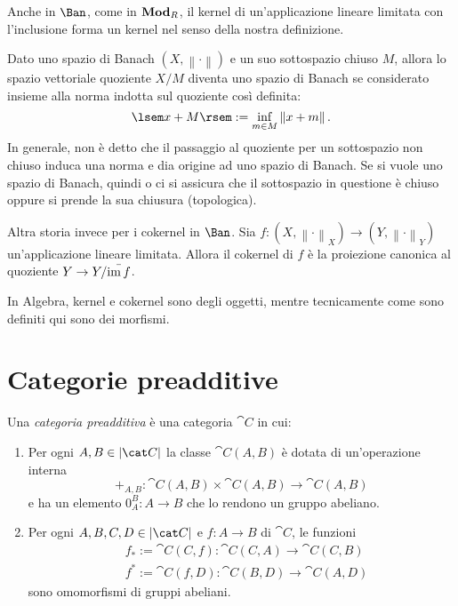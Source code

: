 \begin{example}
  Anche in \(\Ban\), come in \(\mathbf{Mod}_R\), il kernel di un'applicazione
  lineare limitata con l'inclusione forma un kernel nel senso della
  nostra definizione.
\end{example}

\begin{recall}
  Dato uno spazio di Banach \((X, \left\lVert \cdot \right\rVert)\) e un suo
  sottospazio chiuso \(M\), allora lo spazio vettoriale quoziente
  \(X/M\) diventa uno spazio di Banach se considerato insieme alla norma
  indotta sul quoziente così definita:
  \[
    \lsem x + M \rsem := \inf_{m \in M} \left\lVert x+m \right\rVert .
  \]
  In generale, non è detto che il passaggio al quoziente per un
  sottospazio non chiuso induca una norma e dia origine ad uno spazio di
  Banach. Se si vuole uno spazio di Banach, quindi o ci si assicura che
  il sottospazio in questione è chiuso oppure si prende la sua chiusura
  (topologica).
\end{recall}

\begin{example}
  Altra storia invece per i cokernel in \(\Ban\). Sia
  \(f : (X, \left\lVert \cdot \right\rVert_X) \to (Y, \left\lVert \cdot
  \right\rVert_Y)\) un'applicazione lineare limitata. Allora il cokernel
  di \(f\) è la proiezione canonica al quoziente
  \(Y \to {Y}{/}{\bar{\operatorname{im}f}}\).
\end{example}

\begin{remark}
  In Algebra, kernel e cokernel sono degli oggetti, mentre
  tecnicamente come sono definiti qui sono dei morfismi.
\end{remark}



\section{Categorie preadditive}

\begin{definition}
  Una {\em categoria preadditiva} è una categoria \(\cat C\) in cui:
  \begin{enumerate}[leftmargin=*]
  \item Per ogni \(A, B \in \obj{\cat C}\) la classe \(\cat C(A, B)\) è
    dotata di un'operazione interna
    \[
      +_{A,B} : \cat C (A, B) \times \cat C (A, B) \to \cat C (A, B)
    \]
    e ha un elemento \(0_A^B : A \to B\) che lo rendono un gruppo
    abeliano.
  \item Per ogni \(A, B, C, D \in \obj{\cat C}\) e \(f : A \to B\) di
    \(\cat C\), le funzioni
    \begin{align*}
      & f_\ast := \cat C(C, f) : \cat C(C, A) \to \cat C(C, B) \\
      & f^\ast := \cat C(f, D) : \cat C(B, D) \to \cat C(A, D)
    \end{align*}
    sono omomorfismi di gruppi abeliani.
  \end{enumerate}
\end{definition}

